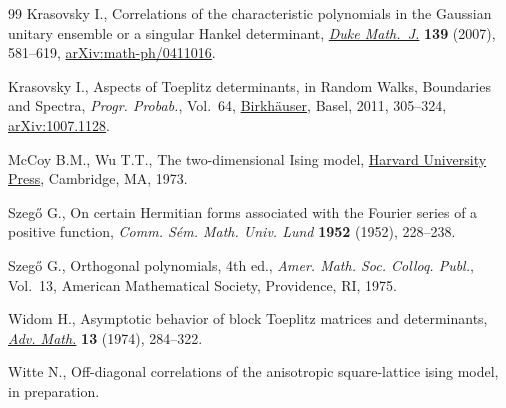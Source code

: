\documentclass[10pt,a4paper]{amsart}
\numberwithin{equation}{section}
\begin{document}
\begin{thebibliography}{99}
Krasovsky I., Correlations of the characteristic polynomials in the
 {G}aussian unitary ensemble or a singular {H}ankel determinant, \href{https://doi.org/10.1215/S0012-7094-07-13936-X}{\textit{Duke
 Math.~J.}} \textbf{139} (2007), 581--619, \href{https://arxiv.org/abs/math-ph/0411016}{arXiv:math-ph/0411016}.

Krasovsky I., Aspects of {T}oeplitz determinants, in Random {W}alks,
 {B}oundaries and {S}pectra, \textit{Progr. Probab.}, Vol.~64,
 \href{https://doi.org/10.1007/978-3-0346-0244-0_16}{Birkh\"auser}, Basel, 2011, 305--324,
 \href{https://arxiv.org/abs/1007.1128}{arXiv:1007.1128}.

McCoy B.M., Wu T.T., The two-dimensional {I}sing model, \href{https://doi.org/10.4159/harvard.9780674180758}{Harvard University
 Press}, Cambridge, MA, 1973.

Szeg\H{o} G., On certain {H}ermitian forms associated with the {F}ourier series
 of a positive function, \textit{Comm. S\'em. Math. Univ. Lund} \textbf{1952} (1952), 228--238.

Szeg\H{o} G., Orthogonal polynomials, 4th ed., \textit{Amer. Math. Soc. Colloq.
 Publ.}, Vol.~13, American Mathematical Society, Providence, RI,
 1975.

Widom H., Asymptotic behavior of block {T}oeplitz matrices and determinants,
 \href{https://doi.org/10.1016/0001-8708(74)90072-3}{\textit{Adv. Math.}} \textbf{13} (1974), 284--322.

Witte N., Off-diagonal correlations of the anisotropic square-lattice ising
 model, in preparation.

\end{thebibliography}
\end{document}
